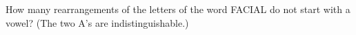 How many rearrangements of the letters of the word FACIAL do not start with a vowel? (The two A's are indistinguishable.)
